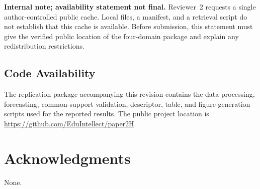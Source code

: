 \documentclass[pdflatex]{sn-jnl}
\begin{document}
\textbf{Internal note; availability statement not final.} Reviewer~2
requests a single author-controlled public cache. Local files, a manifest,
and a retrieval script do not establish that this cache is available.
Before submission, this statement must give the verified public location
of the four-domain package and explain any redistribution restrictions.

\subsection*{Code Availability}
The replication package accompanying this revision contains the data-processing,
forecasting, common-support validation, descriptor, table, and figure-generation
scripts used for the reported results. The public project location is
\url{https://github.com/EduIntellect/paper2H}.

\section*{Acknowledgments}
None.




\end{document}
